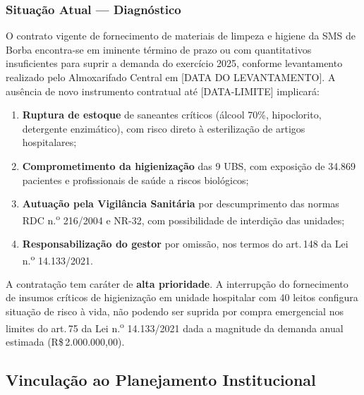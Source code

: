 \documentclass[12pt,a4paper]{article}
\newcommand{\exercicio}{2025}
\begin{document}
\subsubsection{Situação Atual --- Diagnóstico}

O contrato vigente de fornecimento de materiais de limpeza e higiene da SMS de Borba
encontra-se em iminente término de prazo ou com quantitativos insuficientes para suprir
a demanda do exercício \exercicio, conforme levantamento realizado pelo Almoxarifado
Central em [DATA DO LEVANTAMENTO]. A ausência de novo instrumento contratual até
[DATA-LIMITE] implicará:

\begin{enumerate}
  \item \textbf{Ruptura de estoque} de saneantes críticos (álcool 70\%, hipoclorito,
    detergente enzimático), com risco direto à esterilização de artigos hospitalares;
  \item \textbf{Comprometimento da higienização} das 9 UBS, com exposição de
    34.869 pacientes e profissionais de saúde a riscos biológicos;
  \item \textbf{Autuação pela Vigilância Sanitária} por descumprimento das normas RDC
    n.\textsuperscript{o} 216/2004 e NR-32, com possibilidade de interdição das
    unidades;
  \item \textbf{Responsabilização do gestor} por omissão, nos termos do art.\,148
    da Lei n.\textsuperscript{o} 14.133/2021.
\end{enumerate}

\begin{warnbox}
\small
A contratação tem caráter de \textbf{alta prioridade}. A interrupção do fornecimento
de insumos críticos de higienização em unidade hospitalar com 40 leitos configura
situação de risco à vida, não podendo ser suprida por compra emergencial nos limites
do art.\,75 da Lei n.\textsuperscript{o} 14.133/2021 dada a magnitude da demanda
anual estimada (R\$\,2.000.000,00).
\end{warnbox}

\subsection{Vinculação ao Planejamento Institucional}
\end{document}

